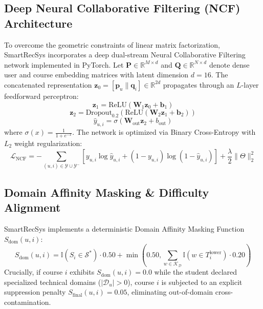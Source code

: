 \documentclass[conference,letterpaper]{IEEEtran}
\begin{document}
\subsection{Deep Neural Collaborative Filtering (NCF) Architecture}
To overcome the geometric constraints of linear matrix factorization, SmartRecSys incorporates a deep dual-stream Neural Collaborative Filtering network implemented in PyTorch. Let $\mathbf{P} \in \mathbb{R}^{M \times d}$ and $\mathbf{Q} \in \mathbb{R}^{N \times d}$ denote dense user and course embedding matrices with latent dimension $d=16$. The concatenated representation $\mathbf{z}_0 = [\mathbf{p}_u \parallel \mathbf{q}_i] \in \mathbb{R}^{2d}$ propagates through an $L$-layer feedforward perceptron:
\begin{equation}
\mathbf{z}_1 = \text{ReLU}(\mathbf{W}_1 \mathbf{z}_0 + \mathbf{b}_1)
\end{equation}
\begin{equation}
\mathbf{z}_2 = \text{Dropout}_{0.2}\left(\text{ReLU}(\mathbf{W}_2 \mathbf{z}_1 + \mathbf{b}_2)\right)
\end{equation}
\begin{equation}
\hat{y}_{u,i} = \sigma(\mathbf{W}_{\text{out}} \mathbf{z}_2 + b_{\text{out}})
\end{equation}
where $\sigma(x) = \frac{1}{1 + e^{-x}}$. The network is optimized via Binary Cross-Entropy with $L_2$ weight regularization:
\begin{equation}
\mathcal{L}_{\text{NCF}} = -\sum_{(u, i) \in \mathcal{Y} \cup \mathcal{Y}^-} \left[ y_{u,i} \log \hat{y}_{u,i} + (1 - y_{u,i}) \log(1 - \hat{y}_{u,i}) \right] + \frac{\lambda}{2} \|\Theta\|_2^2
\end{equation}

\subsection{Domain Affinity Masking \& Difficulty Alignment}
SmartRecSys implements a deterministic Domain Affinity Masking Function $S_{\text{dom}}(u, i)$:
\begin{equation}
S_{\text{dom}}(u, i) = \mathbb{I}(S_i \in \mathcal{S}^*) \cdot 0.50 + \min\left(0.50, \sum_{w \in \mathcal{K}_{\mathcal{D}}} \mathbb{I}(w \in T_i^{\text{lower}}) \cdot 0.20\right)
\end{equation}
Crucially, if course $i$ exhibits $S_{\text{dom}}(u, i) = 0.0$ while the student declared specialized technical domains ($|\mathcal{D}_u| > 0$), course $i$ is subjected to an explicit suppression penalty $S_{\text{final}}(u, i) = 0.05$, eliminating out-of-domain cross-contamination.
\end{document}
